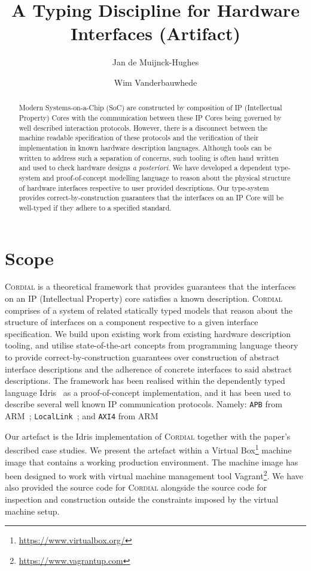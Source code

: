 \documentclass[a4paper,UKenglish]{darts-v2019}
\title{A Typing Discipline for Hardware Interfaces (Artifact)}
\author{Jan de Muijnck-Hughes}
       {University of Glasgow, UK}
       {Jan.deMuijnck-Hughes@glasgow.ac.uk}
       {https://orcid.org/0000-0003-2185-8543}
       {}
\author{Wim Vanderbauwhede}
       {University of Glasgow, UK}
       {Wim.Vanderbauwhede@glasgow.ac.uk}
       {https://orcid.org/0000-0001-6768-0037}
       {}
\newenvironment{scope}{\section{Scope}}{}
\newcommand{\theFramework}{\textsc{Cordial}}
\begin{document}
\maketitle{}

\begin{abstract}
  Modern Systems-on-a-Chip (SoC) are constructed by composition of IP (Intellectual Property) Cores with the communication between these IP Cores being governed by well described interaction protocols.
  However, there is a disconnect between the machine readable specification of these protocols and the verification of their implementation in known hardware description languages.
  Although tools can be written to address such a separation of concerns, such tooling is often hand written and used to check hardware designs \emph{a posteriori}.
  We have developed a dependent type-system and proof-of-concept modelling language to reason about the physical structure of hardware interfaces respective to user provided descriptions.
  Our type-system provides correct-by-construction guarantees that the interfaces on an IP Core will be well-typed if they adhere to a specified standard.
 \end{abstract}

 \begin{scope}
   \theFramework{} is a theoretical framework that provides guarantees that the interfaces on an IP (Intellectual Property) core satisfies a known description.
   \theFramework{} comprises of a system of related statically typed models that reason about the structure of interfaces on a component respective to a given interface specification.
   We build upon existing work from existing hardware description tooling, and utilise state-of-the-art concepts from programming language theory to provide correct-by-construction guarantees over construction of abstract interface descriptions and the adherence of concrete interfaces to said abstract descriptions.
   The framework has been realised within the dependently typed language Idris~\cite{DBLP:journals/jfp/Brady13} as a proof-of-concept implementation, and it has been used to describe several well known IP communication protocols.
   Namely: \texttt{APB} from ARM~\cite{Arm2010apb}; \texttt{LocalLink}~\cite{Xilink2005locallink}; and \texttt{AXI4} from ARM~\cite{Arm2017axi}

   Our artefact is the Idris implementation of \theFramework{} together with the paper's described case studies.
   We present the artefact within a Virtual Box\footnote{\url{https://www.virtualbox.org/}} machine image that contains a working production environment.
   The machine image has been designed to work with virtual machine management tool Vagrant\footnote{\url{https://www.vagrantup.com}}.
   We have also provided the source code for \theFramework{} alongside the source code for inspection and construction outside the constraints imposed by the virtual machine setup.
\end{scope}
\end{document}
